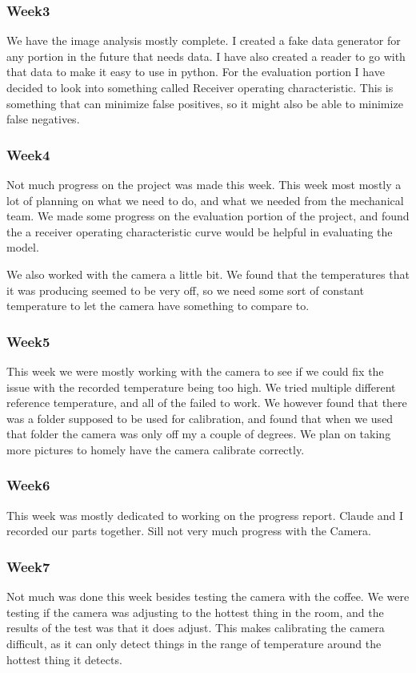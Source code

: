 	\subsubsection*{Week3}
		We have the image analysis mostly complete. I created a fake data generator for any portion in the future that needs data. I have also created a reader to go with that data to make it easy to use in python. For the evaluation portion I have decided to look into something called Receiver operating characteristic. This is something that can minimize false positives, so it might also be able to minimize false negatives.
	\subsubsection*{Week4}
		Not much progress on the project was made this week. This week most mostly a lot of planning on what we need to do, and what we needed from the mechanical team. We made some progress on the evaluation portion of the project, and found the a receiver operating characteristic curve would be helpful in evaluating the model.

		We also worked with the camera a little bit. We found that the temperatures that it was producing seemed to be very off, so we need some sort of constant temperature to let the camera have something to compare to.
	\subsubsection*{Week5}
		This week we were mostly working with the camera to see if we could fix the issue with the recorded temperature being too high. We tried multiple different reference temperature, and all of the failed to work. We however found that there was a folder supposed to be used for calibration, and found that when we used that folder the camera was only off my a couple of degrees. We plan on taking more pictures to homely have the camera calibrate correctly.
	\subsubsection*{Week6}
		This week was mostly dedicated to working on the progress report. Claude and I recorded our parts together. Sill not very much progress with the Camera.
	\subsubsection*{Week7}
		Not much was done this week besides testing the camera with the coffee. We were testing if the camera was adjusting to the hottest thing in the room, and the results of the test was that it does adjust. This makes calibrating the camera difficult, as it can only detect things in the range of temperature around the hottest thing it detects.
